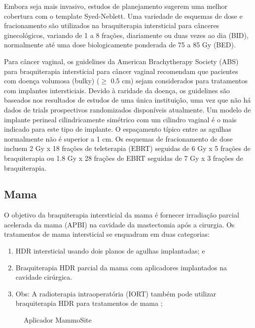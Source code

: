 \documentclass[11pt,a4paper]{article}
\begin{document}
	Embora seja mais invasivo, estudos de planejamento sugerem uma melhor cobertura com o template Syed-Neblett. Uma variedade de esquemas de dose e fracionamento são utilizados na braquiterapia intersticial para cânceres ginecológicos, variando de 1 a 8 frações, diariamente ou duas vezes ao dia (BID), normalmente até uma dose biologicamente ponderada de 75 a 85 Gy (BED).

	Para câncer vaginal, os guidelines da American Brachytherapy Society (ABS) para braquiterapia intersticial para câncer vaginal recomendam que pacientes com doença volumosa (bulky) ($\geq$ 0.5 cm) sejam considerados para tratamentos com implantes intersticiais. Devido à raridade da doença, os guidelines são baseados nos resultados de estudos de uma única instituição, uma vez que não há dados de trials prospectivos randomizados disponíveis atualmente. Um modelo de implante perineal cilindricamente simétrico com um cilindro vaginal é o mais indicado para este tipo de implante. O espaçamento típico entre as agulhas normalmente não é superior a 1 cm. Os esquemas de fracionamento de dose incluem 2 Gy x 18 frações de teleterapia (EBRT) seguidas de 6 Gy x 5 frações de braquiterapia ou  1.8 Gy x 28 frações de EBRT seguidas de 7 Gy x 3 frações de braquiterapia.

\subsection*{Mama}

	O objetivo da braquiterapia intersticial da mama é fornecer irradiação parcial acelerada da mama (APBI) na cavidade da mastectomia após a cirurgia. Os tratamentos de mama intersticial se enquadram em duas categorias:

	\begin{enumerate}
		\item HDR intersticial usando dois planos de agulhas implantadas; e
		\item Braquiterapia HDR parcial da mama com aplicadores implantados na cavidade cirúrgica.
		\item Obs: A radioterapia intraoperatória (IORT) também pode utilizar braquiterapia HDR para tratamentos de mama ;
	\end{enumerate}

	\begin{figure}
		\centering
		\caption{Aplicador MammoSite}
		\label{fig:mamosite}
	\end{figure}
\end{document}
